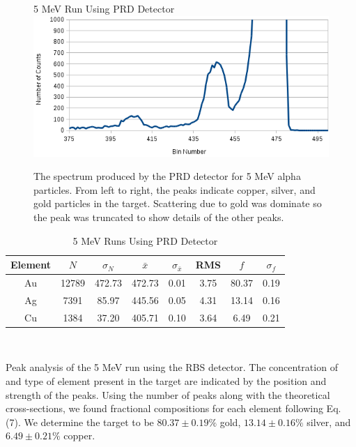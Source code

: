 \documentclass[10pt]{IEEEtran}
\begin{document}
\begin{figure}[!hbt]
       \begin{center}
       5 MeV Run Using PRD Detector
       \includegraphics[width=\columnwidth]{5mevprd}
       \caption{The spectrum produced by the PRD detector for 5 MeV alpha particles. From left to right, the peaks indicate copper, silver, and gold particles in the target. Scattering due to gold was dominate so the peak was truncated to show details of the other peaks.}
       \label{fig:5PRD}
       \end{center}
\end{figure}    
    
    \begin{table}[!hbt]
        \begin{center}
        \caption{5 MeV Runs Using PRD Detector}
        \label{tab:5PRD}
        \begin{tabular}{c|ccccccc}
             Element & $N$ & $\sigma_N$ & $\bar{x}$ & $\sigma_{\bar{x}}$ & RMS & $f$ & $\sigma_f$\\
             \hline\hline
			Au & 12789 & 472.73 & 472.73 & 0.01 & 3.75 & 80.37 & 0.19 \\
			Ag & 7391 & 85.97 & 445.56 & 0.05 & 4.31 & 13.14 & 0.16 \\
			Cu & 1384 & 37.20 & 405.71 & 0.10 & 3.64 & 6.49 & 0.21 \\
			\hline
        \end{tabular}\\
        \end{center}
                Peak analysis of the 5 MeV run using the RBS detector. The concentration of and type of element present in the target are indicated by the position and strength of the peaks. Using the number of peaks along with the theoretical cross-sections, we found fractional compositions for each element following Eq. (7). We determine the target to be $80.37\pm0.19\%$ gold, $13.14\pm0.16\%$ silver, and $6.49\pm0.21\%$ copper.
    \end{table}
\end{document}
